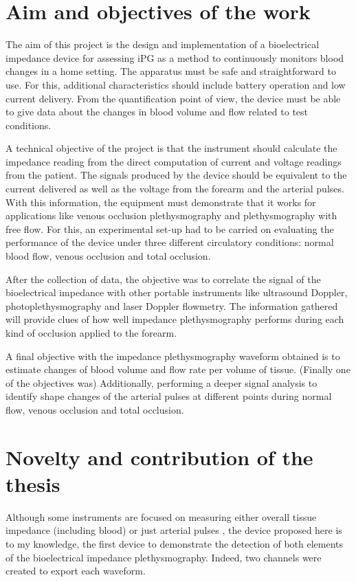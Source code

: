 \section{Aim and objectives of the work}
The aim of this project is the design and implementation of a bioelectrical impedance device for assessing iPG as a method to continuously monitors blood changes in a home setting. The apparatus must be safe and straightforward to use. For this, additional characteristics should include battery operation and low current delivery. From the quantification point of view, the device must be able to give data about the changes in blood volume and flow related to test conditions. 

A technical objective of the project is that the instrument should calculate the impedance reading from the direct computation of current and voltage readings from the patient. The signals produced by the device should be equivalent to the current delivered as well as the voltage from the forearm and the arterial pulses. With this information, the equipment must demonstrate that it works for applications like venous occlusion plethysmography and plethysmography with free flow. For this, an experimental set-up had to be carried on evaluating the performance of the device under three different circulatory conditions: normal blood flow, venous occlusion and total occlusion. 

After the collection of data, the objective was to correlate the signal of the bioelectrical impedance with other portable instruments like ultrasound Doppler, photoplethysmography and laser Doppler flowmetry. The information gathered will provide clues of how well impedance plethysmography performs during each kind of occlusion applied to the forearm. 

A final objective with the impedance plethysmography waveform obtained is to estimate changes of blood volume and flow rate per volume of tissue. (Finally one of the objectives was) Additionally, performing a deeper signal analysis to identify shape changes of the arterial pulses at different points during normal flow, venous occlusion and total occlusion. 

\section{Novelty and contribution of the thesis}

Although some instruments are focused on measuring either overall tissue impedance (including blood) \cite{mohapatra1979measurement, costeloe1980continuous, yamakoshi1980limb} or just arterial pulses \cite{corciova2011peripheral, porter1985measurement, brown1975impedance, marks1985computer}, the device proposed here is to my knowledge, the first device to demonstrate the detection of both elements of the bioelectrical impedance plethysmography. Indeed, two channels were created to export each waveform. 

